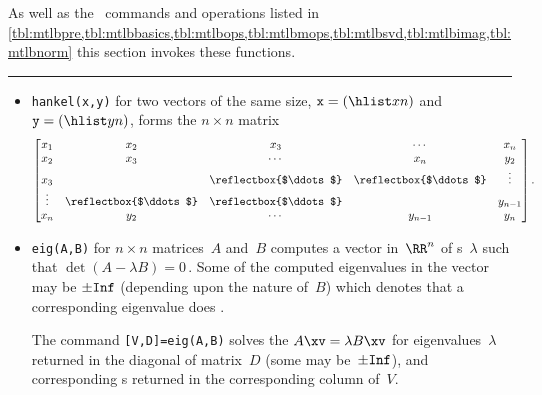 \begin{reduce}
\begin{table}
\caption{As well as the \script\ commands and operations listed in 
\cref{tbl:mtlbpre,tbl:mtlbbasics,tbl:mtlbops,tbl:mtlbmops,tbl:mtlbsvd,tbl:mtlbimag,tbl:mtlbnorm} this section invokes these functions.} \label{tbl:mtlbexpf}
\smallskip\hrule
\begin{minipage}{\linewidth}
\begin{itemize}
\item {}\verb|hankel(x,y)| for two 
vectors of the same size, \(\verb|x|=(\hlist xn)\) and \(\verb|y|=(\hlist yn)\), forms the \(n\times n\) matrix
\def\adots{\reflectbox{$\ddots$}}
\begin{equation*}
\begin{bmatrix} 
x_1&x_2&x_3&\cdots&x_n \\
x_2&x_3&\cdots&x_n&y_2\\
x_3&&\adots&\adots&\vdots\\
\vdots&\adots&\adots&&y_{n-1}\\
x_n&y_2&\cdots&y_{n-1}&y_n
\end{bmatrix}.
\end{equation*}

\item {}\verb|eig(A,B)| for \(n\times n\) matrices~\(A\) and~\(B\) computes a vector in~\(\RR^n\) of s~\(\lambda\) such that \(\det(A-\lambda B)=0\)\,.
Some of the computed eigenvalues in the vector may be \(\pm\verb|Inf|\) (depending upon the nature of~\(B\)) which denotes that a corresponding eigenvalue does .

The command \verb|[V,D]=eig(A,B)| solves the  \(A\xv=\lambda B\xv\) for eigenvalues~\(\lambda\) returned in the diagonal of matrix~\(D\) (some may be~\(\pm\verb|Inf|\)), and corresponding s returned in the corresponding column of~\(V\).


\end{itemize}
\end{minipage}
\end{table}
\end{reduce}

